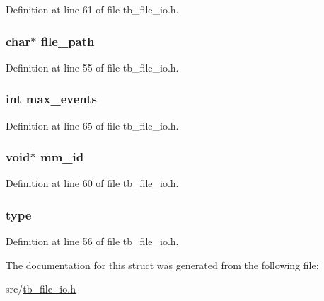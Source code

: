 Definition at line 61 of file tb\-\_\-file\-\_\-io.\-h.

\hypertarget{structtb__file__t_a19064fd51f3a2b4b3c6e8ac8c09850c2}{
\subsubsection[{file\-\_\-path}]{\setlength{\rightskip}{0pt plus 5cm}char$\ast$ file\-\_\-path}}\label{structtb__file__t_a19064fd51f3a2b4b3c6e8ac8c09850c2}


Definition at line 55 of file tb\-\_\-file\-\_\-io.\-h.

\hypertarget{structtb__file__t_af33c7ec0520688c34f813b2ef1e2a8a8}{
\subsubsection[{max\-\_\-events}]{\setlength{\rightskip}{0pt plus 5cm}int max\-\_\-events}}\label{structtb__file__t_af33c7ec0520688c34f813b2ef1e2a8a8}


Definition at line 65 of file tb\-\_\-file\-\_\-io.\-h.

\hypertarget{structtb__file__t_a5be3643cb0aa04b06dd3f51a963a2b0f}{
\subsubsection[{mm\-\_\-id}]{\setlength{\rightskip}{0pt plus 5cm}void$\ast$ mm\-\_\-id}}\label{structtb__file__t_a5be3643cb0aa04b06dd3f51a963a2b0f}


Definition at line 60 of file tb\-\_\-file\-\_\-io.\-h.

\hypertarget{structtb__file__t_a07ad170ac1adff83d1576b84ae995524}{
\subsubsection[{type}]{ type}}\label{structtb__file__t_a07ad170ac1adff83d1576b84ae995524}


Definition at line 56 of file tb\-\_\-file\-\_\-io.\-h.



The documentation for this struct was generated from the following file\-:\begin{DoxyCompactItemize}
\item 
src/\hyperlink{tb__file__io_8h}{tb\-\_\-file\-\_\-io.\-h}\end{DoxyCompactItemize}
